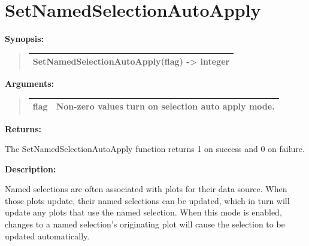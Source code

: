 \documentclass[letterpaper,10pt,english]{sphinxmanual}
\begin{document}
\section{SetNamedSelectionAutoApply}
\label{functions:setnamedselectionautoapply}
\begin{DUlineblock}{0em}
\item[] \textbf{Synopsis:}
\end{DUlineblock}
\begin{quote}

\begin{tabulary}{\linewidth}{|L|}
\hline

SetNamedSelectionAutoApply(flag) -\textgreater{} integer
\\
\hline\end{tabulary}

\end{quote}

\begin{DUlineblock}{0em}
\item[] 
\item[] \textbf{Arguments:}
\end{DUlineblock}
\begin{quote}

\begin{tabulary}{\linewidth}{|L|L|}
\hline

flag
 & 
Non-zero values turn on selection auto apply mode.
\\
\hline\end{tabulary}

\end{quote}

\begin{DUlineblock}{0em}
\item[] 
\item[] \textbf{Returns:}
\item[] The SetNamedSelectionAutoApply function returns 1 on success and 0 on failure.
\item[] 
\item[] \textbf{Description:}
\item[] Named selections are often associated with plots for their data source. When
those plots update, their named selections can be updated, which in turn will
update any plots that use the named selection. When this mode is enabled, changes
to a named selection's originating plot will cause the selection to be updated
automatically.
\end{DUlineblock}
\end{document}
